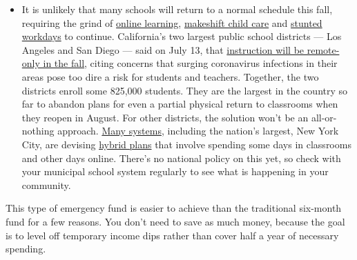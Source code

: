 \begin{itemize}
  \begin{itemize}
  \tightlist
  \item
    It is unlikely that many schools will return to a normal schedule
    this fall, requiring the grind of
    \href{https://www.nytimes.com/2020/06/05/us/coronavirus-education-lost-learning.html?action=click\&pgtype=Article\&state=default\&region=MAIN_CONTENT_3\&context=storylines_faq}{online
    learning},
    \href{https://www.nytimes.com/2020/05/29/us/coronavirus-child-care-centers.html?action=click\&pgtype=Article\&state=default\&region=MAIN_CONTENT_3\&context=storylines_faq}{makeshift
    child care} and
    \href{https://www.nytimes.com/2020/06/03/business/economy/coronavirus-working-women.html?action=click\&pgtype=Article\&state=default\&region=MAIN_CONTENT_3\&context=storylines_faq}{stunted
    workdays} to continue. California's two largest public school
    districts --- Los Angeles and San Diego --- said on July 13, that
    \href{https://www.nytimes.com/2020/07/13/us/lausd-san-diego-school-reopening.html?action=click\&pgtype=Article\&state=default\&region=MAIN_CONTENT_3\&context=storylines_faq}{instruction
    will be remote-only in the fall}, citing concerns that surging
    coronavirus infections in their areas pose too dire a risk for
    students and teachers. Together, the two districts enroll some
    825,000 students. They are the largest in the country so far to
    abandon plans for even a partial physical return to classrooms when
    they reopen in August. For other districts, the solution won't be an
    all-or-nothing approach.
    \href{https://bioethics.jhu.edu/research-and-outreach/projects/eschool-initiative/school-policy-tracker/}{Many
    systems}, including the nation's largest, New York City, are
    devising
    \href{https://www.nytimes.com/2020/06/26/us/coronavirus-schools-reopen-fall.html?action=click\&pgtype=Article\&state=default\&region=MAIN_CONTENT_3\&context=storylines_faq}{hybrid
    plans} that involve spending some days in classrooms and other days
    online. There's no national policy on this yet, so check with your
    municipal school system regularly to see what is happening in your
    community.
  \end{itemize}
\end{itemize}

This type of emergency fund is easier to achieve than the traditional
six-month fund for a few reasons. You don't need to save as much money,
because the goal is to level off temporary income dips rather than cover
half a year of necessary spending.

